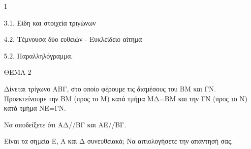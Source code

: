 \begin{ylh}{1}
    \item 3.1. Είδη και στοιχεία τριγώνων
    \item 4.2. Τέμνουσα δύο ευθειών - Ευκλείδειο αίτημα
    \item 5.2. Παραλληλόγραμμα.
\end{ylh}

ΘΕΜΑ 2

Δίνεται τρίγωνο ΑΒΓ, στο οποίο φέρουμε τις διαμέσους του ΒΜ και ΓΝ. Προεκτείνουμε την ΒΜ (προς το Μ) κατά τμήμα ΜΔ=ΒΜ και την ΓΝ (προς το Ν) κατά τμήμα ΝΕ=ΓΝ.

\begin{alist}
\item Να αποδείξετε ότι ΑΔ//ΒΓ και ΑΕ//ΒΓ. 

\item Είναι τα σημεία Ε, Α και Δ συνευθειακά; Να αιτιολογήσετε την απάντησή σας.

\end{alist}
